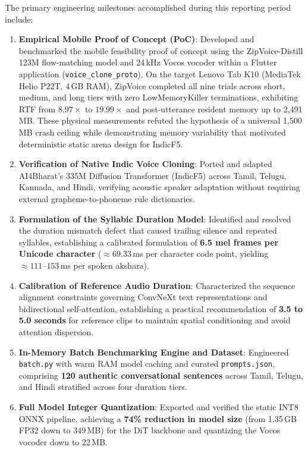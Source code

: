 The primary engineering milestones accomplished during this reporting period include:
\begin{enumerate}
    \item \textbf{Empirical Mobile Proof of Concept (PoC)}: Developed and benchmarked the mobile feasibility proof of concept using the ZipVoice-Distill 123M flow-matching model and 24\,kHz Vocos vocoder within a Flutter application (\texorpdfstring{\texttt{voice\_clone\_proto}}{voice\_clone\_proto}). On the target Lenovo Tab K10 (MediaTek Helio P22T, 4\,GB RAM), ZipVoice completed all nine trials across short, medium, and long tiers with zero LowMemoryKiller terminations, exhibiting RTF from $8.97\times$ to $19.99\times$ and post-utterance resident memory up to 2,491\,MB. These physical measurements refuted the hypothesis of a universal 1,500\,MB crash ceiling while demonstrating memory variability that motivated deterministic static arena design for IndicF5.
    \item \textbf{Verification of Native Indic Voice Cloning}: Ported and adapted AI4Bharat's 335M Diffusion Transformer (IndicF5) across Tamil, Telugu, Kannada, and Hindi, verifying acoustic speaker adaptation without requiring external grapheme-to-phoneme rule dictionaries.
    \item \textbf{Formulation of the Syllabic Duration Model}: Identified and resolved the duration mismatch defect that caused trailing silence and repeated syllables, establishing a calibrated formulation of \textbf{6.5 mel frames per Unicode character} ($\approx 69.33$\,ms per character code point, yielding $\approx 111\text{--}153$\,ms per spoken akshara).
    \item \textbf{Calibration of Reference Audio Duration}: Characterized the sequence alignment constraints governing ConvNeXt text representations and bidirectional self-attention, establishing a practical recommendation of \textbf{3.5 to 5.0 seconds} for reference clips to maintain spatial conditioning and avoid attention dispersion.
    \item \textbf{In-Memory Batch Benchmarking Engine and Dataset}: Engineered \texttt{batch.py} with warm RAM model caching and curated \texttt{prompts.json}, comprising \textbf{120 authentic conversational sentences} across Tamil, Telugu, and Hindi stratified across four duration tiers.
    \item \textbf{Full Model Integer Quantization}: Exported and verified the static INT8 ONNX pipeline, achieving a \textbf{74\% reduction in model size} (from 1.35\,GB FP32 down to 349\,MB) for the DiT backbone and quantizing the Vocos vocoder down to 22\,MB.

\end{enumerate}
